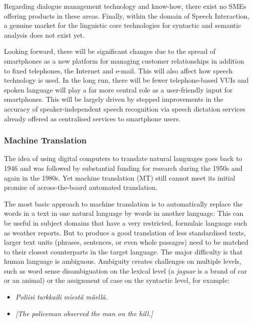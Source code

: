 \documentclass[]{../../metanetpaper}
\begin{document}
\begin{multicols}{2}
Regarding dialogue management technology and know-how, there exist no SMEs
offering products in these areas. Finally, within the domain of Speech
Interaction, a genuine market for the linguistic core technologies for
syntactic and semantic analysis does not exist yet.

Looking forward, there will be significant changes due to the spread of
smartphones as a new platform for managing customer relationships in addition
to fixed telephones, the Internet and e-mail. This will also affect how speech
technology is used. In the long run, there will be fewer
telephone-based VUIs and spoken language will play a far more central role as a
user-friendly input for smartphones. This will be largely driven by stepped
improvements in the accuracy of speaker-independent speech recognition via
speech dictation services already offered as centralised services to smartphone
users.

\subsubsection{Machine Translation}


The idea of using digital computers to translate natural languages goes back to
1946 and was followed by substantial funding for research during the 1950s and
again in the 1980s. Yet machine translation (MT) still cannot meet its initial
promise of across-the-board automated translation.

The most basic approach to machine translation is to automatically replace the
words in a text in one natural language by words in another language. This can
be useful in subject domains that have a very restricted, formulaic language
such as weather reports. But to produce a good translation of less standardised
texts, larger text units (phrases, sentences, or even whole passages) need to
be matched to their closest counterparts in the target language. The major
difficulty is that human language is ambiguous. Ambiguity creates challenges on
multiple levels, such as word sense disambiguation on the lexical level (a
\textit{jaguar} is a brand of car or an animal) or the assignment of case on the
syntactic level, for example:
\begin{itemize}
\item[] {\foreignlanguage{finnish}
         {\textit{Poliisi tarkkaili miestä mäellä.}}} 
\item        \textit{[The policeman observed the man on the hill.]}


\end{itemize}
\end{multicols}
\end{document}
